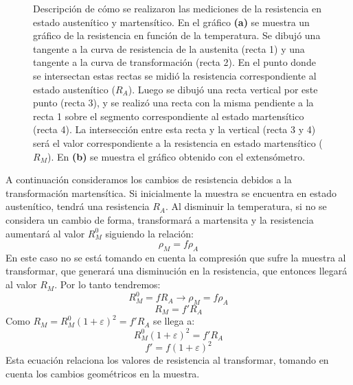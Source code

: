 \documentclass[a4paper,12pt,fleqn,twoside,openany]{book}
\begin{document}
\begin{figure}
    \caption{Descripción de cómo se realizaron las mediciones de la resistencia en estado austenítico y martensítico. En el gráfico \textbf{(a)} se muestra un gráfico de la resistencia en función de la temperatura. Se dibujó una tangente a la curva de resistencia de la austenita (recta 1) y una tangente a la curva de transformación (recta 2). En el punto donde se intersectan estas rectas se midió la resistencia correspondiente al estado austenítico ($R_A$). Luego se dibujó una recta vertical por este punto (recta 3), y se realizó una recta con la misma pendiente a la recta 1 sobre el segmento correspondiente al estado martensítico (recta 4). La intersección entre esta recta  y la vertical (recta 3 y 4) será el valor correspondiente a la resistencia en estado martensítico ($R_M$). En \textbf{(b)} se muestra el gráfico obtenido con el extensómetro.}
    \label{fig:ExpStrainRes}
    \end{figure}


A continuación consideramos los cambios de resistencia debidos a la transformación martensítica. Si inicialmente la muestra se encuentra en estado austenítico, tendrá una resistencia $R_A$. Al disminuir la temperatura, si no se considera un cambio de forma, transformará a martensita y la resistencia aumentará al valor $R_M ^0 $ siguiendo la relación: 
\begin{equation}
  \rho_M =f \rho_A
\end{equation}
En este caso no se está tomando en cuenta la compresión que sufre la muestra al transformar, que generará una disminución en la resistencia, que entonces llegará al valor ${R_M}$. Por lo tanto tendremos:
\begin{equation}
 R_M^0 =fR_A   \longrightarrow    \rho_M=f\rho_A 
\end{equation}
\begin{equation}
 {R_M}=f'R_A 
\end{equation}
Como $R_M=R_M^0 (1+\varepsilon)^2 = f' R_A$ se llega a:
\begin{equation}
 R_M^0 (1+\varepsilon)^2 = f'R_A
\end{equation}
\begin{equation}
f' = f (1+\varepsilon)^2  \label{fprima}
\end{equation}
Esta ecuación relaciona los valores de resistencia al transformar, tomando en cuenta los cambios geométricos en la muestra. 

  
\end{document}
